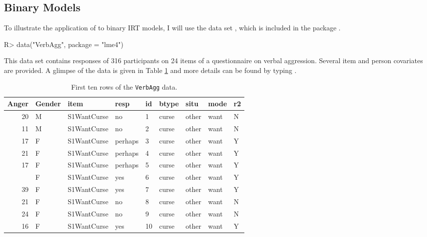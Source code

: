 \documentclass[
]{jss}
\begin{document}
\hypertarget{binary}{%
\subsection{Binary Models}\label{binary}}

To illustrate the application of  to binary IRT models, I will
use the  data set \citep{deboeck2004}, which is included
in the  package \citep{lme4}.

\begin{CodeChunk}

\begin{CodeInput}
R> data("VerbAgg", package = "lme4")
\end{CodeInput}
\end{CodeChunk}

This data set contains responses of 316 participants on 24 items of a
questionnaire on verbal aggression. Several item and person covariates
are provided. A glimpse of the data is given in Table
\ref{tab:head-VerbAgg} and more details can be found by typing
.

\begin{CodeChunk}
\begin{table}

\caption{\label{tab:head-VerbAgg}First ten rows of the \texttt{VerbAgg} data.}
\centering
\begin{tabular}[t]{rllllllll}
\toprule
Anger & Gender & item & resp & id & btype & situ & mode & r2\\
\midrule
20 & M & S1WantCurse & no & 1 & curse & other & want & N\\
11 & M & S1WantCurse & no & 2 & curse & other & want & N\\
17 & F & S1WantCurse & perhaps & 3 & curse & other & want & Y\\
21 & F & S1WantCurse & perhaps & 4 & curse & other & want & Y\\
17 & F & S1WantCurse & perhaps & 5 & curse & other & want & Y\\
\addlinespace
21 & F & S1WantCurse & yes & 6 & curse & other & want & Y\\
39 & F & S1WantCurse & yes & 7 & curse & other & want & Y\\
21 & F & S1WantCurse & no & 8 & curse & other & want & N\\
24 & F & S1WantCurse & no & 9 & curse & other & want & N\\
16 & F & S1WantCurse & yes & 10 & curse & other & want & Y\\
\bottomrule
\end{tabular}
\end{table}

\end{CodeChunk}
\end{document}
